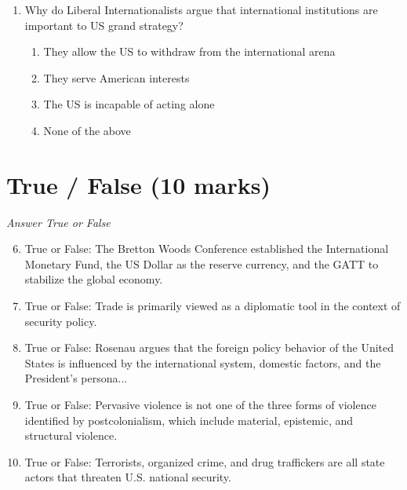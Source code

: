 \documentclass[12pt]{article}
\begin{document}
\begin{enumerate}[label=\arabic*.]
\begin{enumerate}[label=(\alph*)]
    \item on nuclear weapons signed between the United States and the Soviet Union.
    \item cutting conventional arms in Europe.
    \item to be rejected by the U.S. Senate.
    \item mandating the elimination of many long-range nuclear missiles.
\end{enumerate}
\item Why do Liberal Internationalists argue that international institutions are important to US grand strategy?
\begin{enumerate}[label=(\alph*)]
    \item They allow the US to withdraw from the international arena
    \item They serve American interests
    \item The US is incapable of acting alone
    \item None of the above
\end{enumerate}
\end{enumerate}

\section*{True / False (10 marks)}
\textit{Answer True or False}
\begin{enumerate}[label=\arabic*.]
\setcounter{enumi}{5}
\item True or False: The Bretton Woods Conference established the International Monetary Fund, the US Dollar as the reserve currency, and the GATT to stabilize the global economy.
\item True or False: Trade is primarily viewed as a diplomatic tool in the context of security policy.
\item True or False: Rosenau argues that the foreign policy behavior of the United States is influenced by the international system, domestic factors, and the President's persona...
\item True or False: Pervasive violence is not one of the three forms of violence identified by postcolonialism, which include material, epistemic, and structural violence.
\item True or False: Terrorists, organized crime, and drug traffickers are all state actors that threaten U.S. national security.
\end{enumerate}
\end{document}
